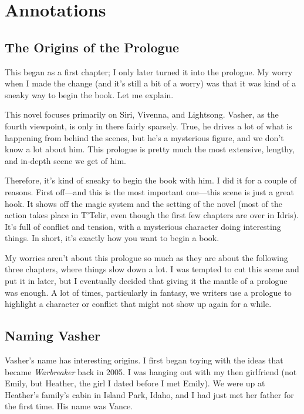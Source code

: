 \section*{Annotations}

\subsection*{The Origins of the Prologue}

This began as a first chapter; I only later turned it into the prologue. My worry when I made the change (and it’s still a bit of a worry) was that it was kind of a sneaky way to begin the book. Let me explain.

This novel focuses primarily on Siri, Vivenna, and Lightsong. Vasher, as the fourth viewpoint, is only in there fairly sparsely. True, he drives a lot of what is happening from behind the scenes, but he’s a mysterious figure, and we don’t know a lot about him. This prologue is pretty much the most extensive, lengthy, and in-depth scene we get of him.

Therefore, it’s kind of sneaky to begin the book with him. I did it for a couple of reasons. First off—and this is the most important one—this scene is just a great hook. It shows off the magic system and the setting of the novel (most of the action takes place in T’Telir, even though the first few chapters are over in Idris). It’s full of conflict and tension, with a mysterious character doing interesting things. In short, it’s exactly how you want to begin a book.

My worries aren’t about this prologue so much as they are about the following three chapters, where things slow down a lot. I was tempted to cut this scene and put it in later, but I eventually decided that giving it the mantle of a prologue was enough. A lot of times, particularly in fantasy, we writers use a prologue to highlight a character or conflict that might not show up again for a while.

\subsection*{Naming Vasher}

Vasher’s name has interesting origins. I first began toying with the ideas that became \textit{Warbreaker} back in 2005. I was hanging out with my then girlfriend (not Emily, but Heather, the girl I dated before I met Emily). We were up at Heather’s family’s cabin in Island Park, Idaho, and I had just met her father for the first time. His name was Vance.


